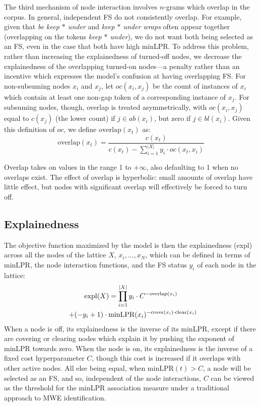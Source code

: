 \documentclass[11pt,letterpaper]{article}
\newcommand{\gap}{$*$\xspace}
\newcommand{\ex}[1]{\textit{#1}\xspace}
\newcommand{\minLPR}{\ensuremath{\text{minLPR}}}
\newcommand{\cover}{\ensuremath{\text{cover}}\xspace}
\newcommand{\clear}{\ensuremath{\text{clear}}\xspace}
\newcommand{\overlap}{\ensuremath{\text{overlap}}\xspace}
\newcommand{\expl}{\ensuremath{\text{expl}}\xspace}
\begin{document}
The third mechanism of node interaction involves $n$-grams which overlap in the corpus. In general, independent FS do not consistently overlap. For example, given that \ex{be keep \gap under} and \ex{keep \gap under wraps} often appear together (overlapping on the tokens \ex{keep \gap under}), we do not want both being selected as an FS, even in the case that both have high minLPR. To address this problem, rather than increasing the explainedness of turned-off nodes, we decrease the explainedness of the overlapping turned-on nodes---a penalty rather than an incentive which expresses the model's confusion at having overlapping FS. For non-subsuming nodes $x_i$ and $x_j$, let $\mathit{oc}(x_i,x_j)$ be the count of instances of $x_i$ which contain at least one non-gap token of a corresponding instance of $x_j$. For subsuming nodes, though, overlap is treated asymmetrically, with $\mathit{oc}(x_i,x_j)$ equal to $c(x_j)$ (the lower count) if $j \in ab(x_i)$, but zero if $j \in bl(x_i)$.  Given this definition of $\mathit{oc}$, we define $\overlap(x_t)$ as:
\begin{displaymath}
	\overlap(x_t) = \frac{c(x_t)}{c(x_t) - \sum_{i=1}^{|X|}{y_i\cdot\mathit{oc}(x_t,x_i)}}
\end{displaymath}

Overlap takes on values in the range 1 to $+\infty$, also defaulting to 1 when no overlaps exist. The effect of overlap is hyperbolic: small amounts of overlap have little effect, but nodes with significant overlap will effectively be forced to turn off. 

\subsection{Explainedness}

The objective function maximized by the model is then the explainedness (\expl) across all the nodes of the lattice $X$, $x_i,\dots,x_{N}$, which can be defined in terms of \minLPR, the node interaction functions, and the FS status $y_i$ of each node in the lattice:
%
\begin{multline}
	\expl(X) = \prod_{i=1}^{|X|}{y_i\cdot C^{-\overlap(x_i)}} \\ 
        \hspace*{2mm} + (-y_i + 1)\cdot\minLPR(x_i)^{-\cover(x_i) \cdot \clear(x_i)}
\end{multline}
When a node is off, its explainedness is the inverse of its minLPR, except if there are covering or clearing nodes which explain it by pushing the exponent of minLPR towards zero. When the node is on, its explainedness is the inverse of a fixed cost hyperparameter $C$, though this cost is increased if it overlaps with other active nodes.  All else being equal, when $\minLPR(t) > C$, a node will be selected as an FS, and so, independent of the node interactions, $C$ can be viewed as the threshold for the minLPR association measure under a traditional approach to MWE identification.
\end{document}
